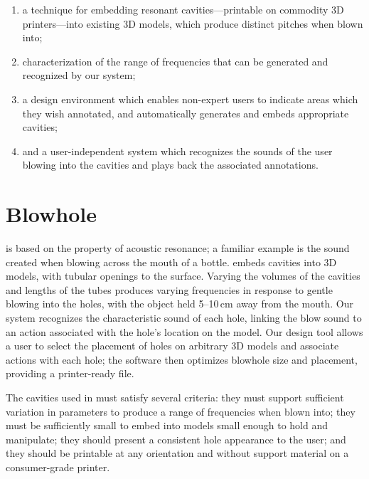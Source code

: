     \begin{enumerate}
        \item a technique for embedding resonant cavities---printable on
          commodity 3D printers---into existing 3D models, which produce distinct
          pitches when blown into;
        \item characterization of the range of frequencies that can be generated
          and recognized by our system;
        \item a design environment which enables non-expert users to indicate
          areas which they wish annotated, and automatically generates and embeds
          appropriate cavities;
        \item and a user-independent system which recognizes the sounds of the
          user blowing into the cavities and plays back the associated
          annotations.
    \end{enumerate}

  \section{Blowhole}
    \bh is based on the property of acoustic resonance; a familiar example is
    the sound created when blowing across the mouth of a bottle. \bh embeds
    cavities into 3D models, with tubular openings to the surface. Varying the
    volumes of the cavities and lengths of the tubes produces varying
    frequencies in response to gentle blowing into the holes, with the object
    held 5--10\,cm away from the mouth. Our system recognizes the characteristic
    sound of each hole, linking the blow sound to an action associated with the
    hole's location on the model. Our design tool allows a user to select the
    placement of holes on arbitrary 3D models and associate actions with each
    hole; the software then optimizes blowhole size and placement, providing a
    printer-ready file.
    
    The cavities used in \bh must satisfy several criteria: they must support
    sufficient variation in parameters to produce a range of frequencies when
    blown into; they must be sufficiently small to embed into models small
    enough to hold and manipulate; they should present a consistent hole
    appearance to the user; and they should be printable at any orientation and
    without support material on a consumer-grade printer.
    
